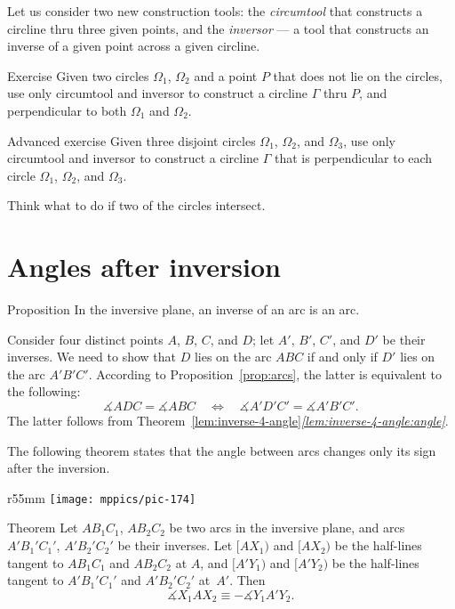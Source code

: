 Let us consider two new construction tools:
the \emph{circumtool} that constructs a circline thru three given points, 
and the \emph{inversor} --- a tool that constructs an inverse of a given point across a given circline.

\begin{thm}{Exercise}\label{ex:construction-perp-clines}
Given  two circles $\Omega_1$, $\Omega_2$ and a point $P$ that does not lie on the circles,
use only circumtool and inversor to construct a circline $\Gamma$ thru $P$, 
and perpendicular to both $\Omega_1$ and $\Omega_2$.
\end{thm}

\begin{thm}{Advanced exercise}\label{ex:3-construction-perp-clines}
Given  three disjoint circles $\Omega_1$, $\Omega_2$, and $\Omega_3$,
use only circumtool and inversor to construct a circline $\Gamma$ that is perpendicular to each circle $\Omega_1$, $\Omega_2$, and $\Omega_3$.

Think what to do if two of the circles intersect.
\end{thm}

\section{Angles after inversion}

\begin{thm}{Proposition}
In the inversive plane, an inverse of an arc is an arc.

\end{thm}

Consider four distinct points $A$, $B$, $C$, and $D$; 
let $A'$, $B'$, $C'$, and $D'$  be their inverses.
We need to show that $D$ lies on the arc $ABC$ if and only if $D'$ lies on the arc $A'B'C'$.
According to Proposition~\ref{prop:arcs},
the latter is equivalent to the following:
$$\measuredangle ADC= \measuredangle ABC
\quad
\iff
\quad  
\measuredangle A'D'C'= \measuredangle A'B'C'.$$
The latter follows from Theorem~\ref{lem:inverse-4-angle}\textit{\ref{lem:inverse-4-angle:angle}}.
\qeds

The following theorem states that the angle between arcs changes only its sign after the inversion.

{

\begin{wrapfigure}{r}{55mm}
\vskip-6mm
\centering
\texttt{[image: mppics/pic-174]}
\end{wrapfigure}

\begin{thm}{Theorem}\label{thm:angle-inversion}
Let $AB_1C_1$, $AB_2C_2$ be two arcs in the inversive plane,
and arcs $A'B_1'C_1'$, $A'B_2'C_2'$ be their inverses.
Let $[AX_1)$ and $[AX_2)$ be the half-lines tangent to $AB_1C_1$ and  $AB_2C_2$ at $A$,
and
$[A'Y_1)$ and $[A'Y_2)$ be the half-lines tangent to $A'B_1'C_1'$ and  $A'B_2'C_2'$ at~$A'$.
Then
$$\measuredangle X_1AX_2\equiv-\measuredangle Y_1A'Y_2.$$

\end{thm}

}


